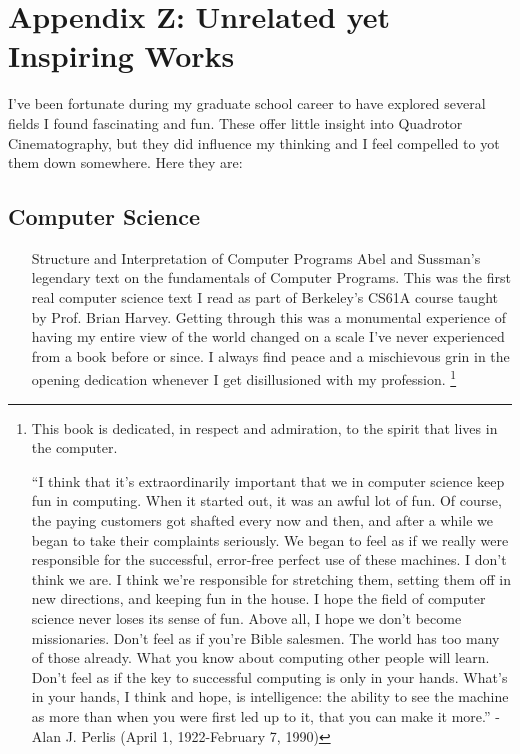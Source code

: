 \chapter{Appendix Z: Unrelated yet Inspiring Works}

I've been fortunate during my graduate school career to have explored several fields I found fascinating and fun. These offer little insight into Quadrotor Cinematography, but they did influence my thinking and I feel compelled to yot them down somewhere. Here they are:


\section{Computer Science}

\begin{itemize}

\item[Structure and Interpretation of Computer Programs] Abel and Sussman's legendary text on the fundamentals of Computer Programs. This was the first real computer science text I read as part of Berkeley's CS61A course taught by Prof. Brian Harvey. Getting through this was a monumental experience of having my entire view of the world changed on a scale I've never experienced from a book before or since. I always find peace and a mischievous grin in the opening dedication whenever I get disillusioned with my profession. \footnote{This book is dedicated, in respect and admiration, to the spirit that lives in the computer.

``I think that it's extraordinarily important that we in computer science keep fun in computing. When it started out, it was an awful lot of fun. Of course, the paying customers got shafted every now and then, and after a while we began to take their complaints seriously. We began to feel as if we really were responsible for the successful, error-free perfect use of these machines. I don't think we are. I think we're responsible for stretching them, setting them off in new directions, and keeping fun in the house. I hope the field of computer science never loses its sense of fun. Above all, I hope we don't become missionaries. Don't feel as if you're Bible salesmen. The world has too many of those already. What you know about computing other people will learn. Don't feel as if the key to successful computing is only in your hands. What's in your hands, I think and hope, is intelligence: the ability to see the machine as more than when you were first led up to it, that you can make it more.'' -Alan J. Perlis (April 1, 1922-February 7, 1990)
}

\end{itemize}


